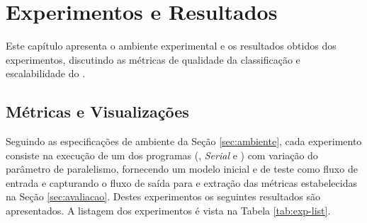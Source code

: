 


% 
% 

\chapter{Experimentos e Resultados}\label{cha:results}

Este capítulo apresenta o ambiente experimental e os resultados obtidos dos
experimentos, discutindo as métricas de qualidade da classificação e
escalabilidade do \mfog.


% 

\section{Métricas e Visualizações}
\label{sec:experiments}

\newcommand{\serial}{\textit{Serial}\xspace}

Seguindo as especificações de ambiente da Seção \ref{sec:ambiente}, cada
experimento consiste na execução de um dos programas (, \serial e
\mfog) com variação do parâmetro de paralelismo, fornecendo um modelo inicial e
\dataset de teste como fluxo de entrada e capturando o fluxo de saída para e
extração das métricas estabelecidas na Seção \ref{sec:avaliacao}.
Destes experimentos os seguintes resultados são apresentados. A listagem dos experimentos é vista na Tabela \ref{tab:exp-list}.

